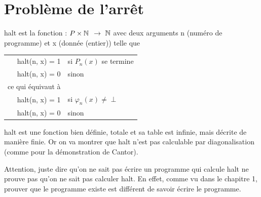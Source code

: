 
\section{Problème de l'arrêt}
\label{sec:probl_me_de_l_arr_t}

\begin{mydef}[halt]
	halt est la fonction : $P \times \mathbb{N}$ $\rightarrow$ $\mathbb{N}$ avec deux arguments n (numéro de programme) et x (donnée (entier)) telle que \\
	\begin{tabular}{rl}
	  halt(n, x) = 1 & si $P_n(x)$ se termine \\
	  halt(n, x) = 0 & sinon \\
	  ce qui équivaut à &\\
	  halt(n, x) = 1 & si $\varphi_n(x)\neq \perp$ \\
	  halt(n, x) = 0 & sinon \\
	\end{tabular}
\end{mydef}

\begin{myprop}
	halt est une fonction bien définie, totale et sa table est infinie, mais décrite de manière finie. Or on va montrer que halt n'est pas calculable par diagonalisation (comme pour la démonstration de Cantor).\\
\end{myprop}

\begin{myrem}
	Attention, juste dire qu'on ne sait pas écrire un programme qui calcule halt ne prouve pas qu'on ne sait pas calculer halt. En effet, comme vu dans le chapitre 1, prouver que le programme existe est différent de savoir écrire le programme.
\end{myrem}

